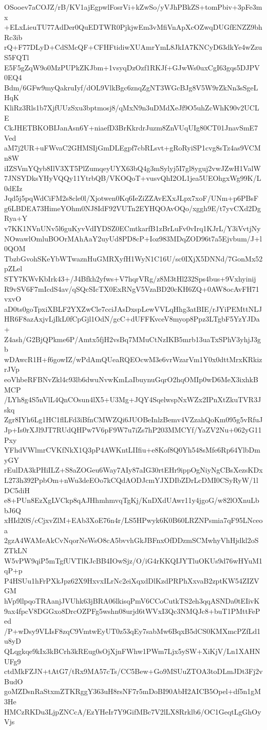 OSooev7aCOJZ/rB/KV1ajEgpwlFosrVi+kZwSo/yVJhPBkZS+tomPbiv+3pFe3mx
+ELxLieuTU77AdDer0QuEDTWR0PjkjwEm3vMfiVnApXcOZwqDUGfENZZ9bhRc3ib
rQ+F77DLyD+CdSMcQF+CFHFtidiwXUAmrYmL8JkIA7KNCyD63dkYe4wZzuS5FQTl
E5F5gZqW9o0MzPUPkZKJbm+1vsyqDzOzf1RKJf+GJwWs0uxCgI63gqs5DJPV0EQ4
Bdm/6GFw9myQakruIyf/dOL9VlkBgc6znqZgNT3WGcBJg8V5W9rZkNn3sSgeLHqK
KliRz3Rls1b7XjfUUzSxu3bptmosj8/qMxN9n3uDMdXeJf9O5uhZcWhK90v2UCLE
CkJHETBKOBIJanAsn6Y+niaefD3BrKkrdrJuzm8ZnVUqUIg80CT01JnavSmE7Ved
aM7j2UR+uFWvaC2GHMSIjGmDLEgpf7cbRLsvt+gRoRyiSP1cvg8sTz4as9VCMn8W
iIZSVmYQyb8IlV3XT5PlZumqeyUYX63bQ4g3mSylyj5I7gl8yguj2vwJZwH1ValW
7JNSYDksYHyVQQy11YtrbQB/VKOQoT+vusvQhI2OL1jea5UEOhgxWg99K/L0dEIz
Jqd5j5pqWdCiFM2s8cle0l/Xjotwen0Kq6IeZiZZAvEXxJLpx7xoF/UNm+p6PBsF
g6LBDEA73HimeYOhm0NJ8IdF92VUTn2EYHQOAvOQo/xggh9E/t7yvCXd2DgRya+Y
v7KK1NVnUNv5l6guKyvVdIYDSZ0ECmtkarfB1zBrLuFv0vIrq1KJrL/Y3iVvtjNy
NOwawlOmluBOOrMAhAaY2uyUd8PD8cP+Ioz983MDqZOD96t7a5Ejvbum/J+l0QOM
TbzbGvohSKeYbWTwaznHuGMRXyfH1WyN1C16U/sc0IXjX5DNNd/7GonMx52pZLel
STY7KWvKbIrk43+/J4Bfkh2yfws+V7hqrVRg/z8M3tHl232Sps4bus+9Vxhyinij
R9vSV6F7mIcdS4av/qSQcSIcTX0ExRNgV5VzaBD20cKH6ZQ+0AW8ocAvFH71vxvO
aD0ts0goTpxiXBLF2YXZwCle7cciJAsDxspLewVVLqHhg3atBIE/rJYiPEMttNLJ
HR6F8azAxjvLjIkL0fCpGjl1OdN/gcC+dUFFKvceV8myop8Ppz3LTgbF5YzYJDa+
Z4ash/G2BjQPkme6P/Amtx5fjH2vsBq7MMuCtNzIKB5mrb13uaTxSPhV3yhjJ3gb
wDAwcR1H+f6gowIZ/wPdAmQUeaRQEOcwM3e6vrWzarVm1Y0x0dttMrxKRkizrJVp
eoVhbeRFBNvZkl4c93lb6dwuNvwKmLaIbuynuGqrO2hqOMIp0wD6MeX3ixhkBMCP
/LYh8g4S5nVlL4QnCOsun4lX5+U3Mg+JQY4SqelwspNxWZx2IPnXtZkuTVR3Jskq
Zgr8IYh6Lg1HC1flLFd3iBfnCMWZQi6JUOBeInlzBemv4VZzahQoKm095g5vRfuJ
Jp+Is0rXJl9JT7RUdQHPw7V6pF9W7u7iZs7hP203MMCYf/YaZV2Nu+062yG11Pxy
YFhdVWlmrCVKfNkX1Q3pP4AWKntLIIfiu+e8Kof8Q0Yh548sMfe6Rp64YlbDmyGY
rEulDA3kPHiILZ+S8aZOGeu6Way7AIy87aIG30rtEHr9ippOgNiyNgCBsXezsKDx
L273h392PpbOm+nWu3deEOo7kCQdAODJcmYJXDIbZDrLcDMI0CSyRyW/1lDC5diH
e8+PUn8EzXgLVCkp8qAJHhmhmvqTgKj/KnDXdUAwr11y4jgoG/w82lOXnuLbbJ6Q
xHId20S/cCjxvZlM+EAb3XoE76n4r/LS5HPwyk6K0B60LRZNPsmia7qF95LNceoa
2gzA4WAMeAkCvNqorNeWsO8cA5bvvhGkJBFnxOfDDzmSCMwhyVhHjdkl2oSZTkLN
W5vPW9qiP5mTgfUVTlKJcBB4IOwSjz/O/iG4rKKQIJYTluOKUs9d76wHYuM1qP+p
P4HSUu1hFrPXkJpz62X9HxvxILrNc2eiXqxdDlKzdPRPhXxvaB2zptKW54ZIZVGM
hVp9llpqoTRAanjJVUhk63jBRA06lkisqPmV6CCoCutkTS2eh3qqASNDa0tEIivK
9ax4fpcV8DGGxo8DrcOZPFg5wshn08urjd6tWVxI3Qc3NMQJc8+buT1PMttFePed
/P+wDsy9VLIsF8zqC9VmtwEyUT0z53qEy7sabMw6BqxB5dCS0KMXmcPZfLd1u8yD
QLqgkqe9kIx3kBCrh3kREug0sOjXjnFWhw1PWm7Ljx5ySW+XiKjV/Ln1XAHNUFg9
ctdMkFZJN+tAtG7/tRx9MA57cTs/CC5Bew+Go9MSUuZTOA3toDLmJDt3Fj2vBudO
goMZDsnRaStxmZTKRggY363uH8rsNF7r5mDoBI90AbH2AICB5Opel+df5n1gM3He
HMCzRKDu3LjpZNCcA/EzYHeIr7Y9GifMBc7V2lLX8Rrklb6/OC1GeqtLgGhOyVjs
